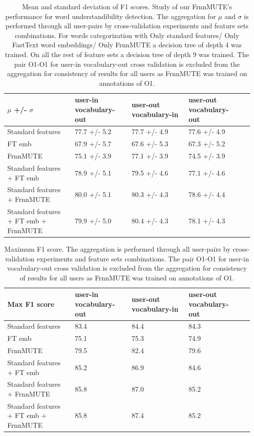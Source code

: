 \begin{table}[h]
\centering
\begin{tabular}{L|MMMN}
\hline
$\mu$ +/- $\sigma$ & user-in vocabulary-out & user-out vocabulary-in & user-out vocabulary-out \\ \hline
Standard features & 77.7 +/- 5.2 & 77.7 +/- 4.9 & 77.6 +/- 4.9 \\[10pt]
FT emb & 67.9 +/- 5.7 & 67.6 +/- 5.3 & 67.3 +/- 5.2 \\[10pt]
FrnnMUTE & 75.1 +/- 3.9 & 77.1 +/- 3.9 & 74.5 +/- 3.9 \\[10pt]
Standard features + FT emb & 78.9 +/- 5.1 & 79.5 +/- 4.6 & 77.1 +/- 4.6 \\[10pt]
Standard features + FrnnMUTE & 80.0 +/- 5.1 & 80.3 +/- 4.3 & 78.6 +/- 4.4 \\[10pt]
Standard features + FT emb + FrnnMUTE & 79.9 +/- 5.0 & 80.4 +/- 4.3 & 78.1 +/- 4.3 \\ \hline
\end{tabular}
  \caption{Mean and standard deviation of F1 scores. Study of our FrnnMUTE's performance for word understandibility detection. The aggregation for $\mu$ and $\sigma$ is performed through all user-pairs by cross-validation experiments and feature sets combinations. For words categorization with Only standard features/ Only FastText word embeddings/ Only FrnnMUTE a decision tree of depth 4 was trained. On all the rest of feature sets a decision tree of depth 9 was trained. The pair O1-O1 for user-in vocabulary-out cross validation is excluded from the aggregation for consistency of results for all users as FrnnMUTE was trained on annotations of O1.}
  \label{tab:frnnmute}
\end{table}


\begin{table}[h]
\centering
\begin{tabular}{L|MMMN}
\hline
Max F1 score & user-in vocabulary-out & user-out vocabulary-in & user-out vocabulary-out \\ \hline
Standard features & 83.4\ & 84.4\ & 84.3\ \\[10pt]
FT emb  & 75.1\ & 75.3\ & 74.9\ \\[10pt]
FrnnMUTE & 79.5\ & 82.4\ & 79.6\ \\[10pt]
Standard features + FT emb & 85.2\ & 86.9\ & 84.6\ \\[10pt]
Standard features + FrnnMUTE & 85.8\ & 87.0\ & 85.2\ \\[10pt]
Standard features + FT emb + FrnnMUTE & 85.8\ & 87.4\ & 85.2\ \\ \hline
\end{tabular}
    \caption{Maximum F1 score. The aggregation is performed through all user-pairs by cross-validation experiments and feature sets combinations. The pair O1-O1 for user-in vocabulary-out cross validation is excluded from the aggregation for consistency of results for all users as FrnnMUTE was trained on annotations of O1.}
      \label{tab:frnnmute-max}
\end{table}


